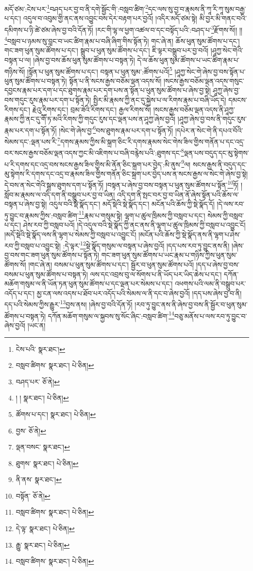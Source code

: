 མདོ་ཙམ་:ངེས་པར་\footnote{ངེས་པའི་  སྣར་ཐང་། }བཤད་པར་བྱ་བ་ནི་དགེ་སྦྱོང་གི་:བསླབ་ཚིག་\footnote{བསླབ་ཚིགས་  སྣར་ཐང་།  པེ་ཅིན། }དང་ལས་སུ་བྱ་བ་རྣམས་ནི་ཀཱ་རི་ཀཱ་སུམ་བརྒྱ་པ་དང་། འདུལ་བ་འབུམ་གྱི་ནང་ནས་འབྱུང་བས་དེར་བརྟག་པར་བྱའོ། །འདིར་མདོ་ཙམ་སྟེ། མི་བྱར་མི་གནང་བའི་དམིགས་པ་ཉི་ཚེ་ཙམ་ཞེས་བྱ་བའི་དོན་ཏོ། །རང་གི་ལྷ་ལ་ཕྱག་འཚལ་བ་དང་བསྟོད་པའི་:བཤད་པ་\footnote{བཤད་པར་  ཅོ་ནེ། }རྫོགས་སོ།། །།\footnote{། །  སྣར་ཐང་།  པེ་ཅིན། }བསླབ་པ་ཉམས་སུ་བླང་བ་ཡང་ཚིག་རྣམ་པ་བཞི་ཞིག་གིས་སྟོན་ཏེ། གང་ཞེ་ན། ཆོས་ཕུན་སུམ་ཚོགས་པ་དང་། གང་ཟག་ཕུན་སུམ་ཚོགས་པ་དང་། སྒྲུབ་པ་ཕུན་སུམ་ཚོགས་པ་དང་། ཇི་ལྟར་བསྒྲུབ་པར་བྱ་བའོ། །ཤཱཀྱ་སེང་གེའི་བསྟན་པ་ལ། །ཞེས་བྱ་བས་ཆོས་ཕུན་སུམ་ཚོགས་པ་བསྟན་ཏེ། དེ་ལ་ཆོས་ཕུན་སུམ་ཚོགས་པ་ཡང་ཚིག་རྣམ་པ་གཉིས་སོ། །སྟོན་པ་ཕུན་སུམ་ཚོགས་པ་དང་། བསྟན་པ་ཕུན་སུམ་:ཚོགས་པའོ།\footnote{ཚོགས་པ་དང་།  སྣར་ཐང་།  པེ་ཅིན། } །ཤཱཀྱ་སེང་གེ་ཞེས་བྱ་བས་སྟོན་པ་ཕུན་སུམ་ཚོགས་པ་བསྟན་ཏེ། སྟོན་པ་ནི་སངས་རྒྱས་བཅོམ་ལྡན་འདས་སོ། །སངས་རྒྱས་བཅོམ་ལྡན་འདས་གསུང་དབྱངས་རྣམ་པར་དག་པ་དང་ཐུགས་རྣམ་པར་དག་པས་ན་སྟོན་པ་ཕུན་སུམ་ཚོགས་པ་ཞེས་བྱ་སྟེ། ཤཱཀྱ་ཞེས་བྱ་བས་གདུང་རུས་རྣམ་པར་དག་པ་སྟོན་ཏེ། སྤྱིར་མི་རྣམས་ཀྱི་ནང་དུ་སྐྱེས་པ་ལ་རིགས་རྣམ་པ་བཞི་ཡོད་དེ། དམངས་རིགས་དང་། རྗེའུ་རིགས་དང་། བྲམ་ཟེའི་རིགས་དང་། རྒྱལ་རིགས་སོ། །སངས་རྒྱས་བཅོམ་ལྡན་འདས་ནི་ཤཱཀྱ་རྣམས་ཀྱི་ནང་དུ་གཽ་ཏ་མའི་རིགས་ཀྱི་གདུང་རུས་དང་ལྡན་པས་ན་ཤཱཀྱ་ཞེས་བྱའོ། །ཤཱཀྱ་ཞེས་བྱ་བས་ནི་གདུང་རུས་རྣམ་པར་དག་པ་སྟོན་ཏོ། །སེང་གེ་ཞེས་བྱ་\footnote{བྱས་  ཅོ་ནེ། }བས་ཐུགས་རྣམ་པར་དག་པ་སྟོན་ཏོ། །དཔེར་ན་སེང་གེ་ནི་དཔའ་བོའི་སེམས་དང་:ལྡན་པས་རི་\footnote{ལྡན་བསང་  སྣར་ཐང་། }དགས་རྣམས་ཀྱིས་མི་སྐྲག་ཅིང་རི་དགས་རྣམས་སེང་གེས་ཟིལ་གྱིས་གནོན་པ་དང་འདྲ་བར་སངས་རྒྱས་བཅོམ་ལྡན་འདས་ཀྱང་མི་འཇིགས་པ་བཞི་བརྙེས་པའི་:ཐུགས་དང་\footnote{ཐུགས་  སྣར་ཐང་།  པེ་ཅིན། }ལྡན་པས་བདུད་དང་མུ་སྟེགས་པ་རི་དགས་དང་འདྲ་བས་སངས་རྒྱས་ཟིལ་གྱིས་མི་ནོན་ཅིང་སྐྲག་པར་བྱེད་:མི་ནུས་\footnote{ནི་ནས་  སྣར་ཐང་། }ལ། སངས་རྒྱས་ནི་བདུད་དང་མུ་སྟེགས་རི་དགས་དང་འདྲ་བ་རྣམས་ཟིལ་གྱིས་གནོན་ཅིང་སྐྲག་པར་བྱེད་པས་ན་སངས་རྒྱས་ལ་སེང་གེ་ཞེས་བྱ་སྟེ། དེ་བས་ན་སེང་གེའི་སྒྲས་ཐུགས་དག་པ་སྟོན་ཏོ། །བསྟན་པ་ཞེས་བྱ་བས་བསྟན་པ་ཕུན་སུམ་ཚོགས་པ་སྟོན་\footnote{བསྟོན་  ཅོ་ནེ། }ཏོ། །སློབ་མ་རྣམས་ལ་འདི་དག་ནི་བསྒྲུབ་པར་བྱ་བ་ཡིན། འདི་དག་ནི་སྤང་བར་བྱ་བ་ཡིན་ནོ་ཞེས་སྟོན་པའི་ཆོས་ལ་བསྟན་པ་ཞེས་བྱ་སྟེ། འདུལ་བའི་སྡེ་སྣོད་དང་། མདོ་སྡེའི་སྡེ་སྣོད་དང་། མངོན་པའི་ཆོས་ཀྱི་སྡེ་སྣོད་དོ། །དེ་ལས་རབ་ཏུ་བྱུང་བ་རྣམས་ཀྱིས་:བསླབ་ཚིག་\footnote{བསླབ་ཚིགས་  སྣར་ཐང་།  པེ་ཅིན། }རྣམ་པ་གསུམ་སྟེ། ལྷག་པ་ཚུལ་ཁྲིམས་ཀྱི་བསླབ་པ་དང་། སེམས་ཀྱི་བསླབ་པ་དང་། ཤེས་རབ་ཀྱི་བསླབ་པའོ། །དེ་འདུལ་བའི་སྡེ་སྣོད་ཀྱི་ནང་ནས་ནི་ལྷག་པ་ཚུལ་ཁྲིམས་ཀྱི་བསླབ་པ་འབྱུང་ངོ། །མདོ་སྡེའི་སྡེ་སྣོད་ལས་ནི་ལྷག་པ་སེམས་ཀྱི་བསླབ་པ་འབྱུང་ངོ། །མངོན་པའི་ཆོས་ཀྱི་སྡེ་སྣོད་ནས་ནི་ལྷག་པ་ཤེས་རབ་ཀྱི་བསླབ་པ་འབྱུང་སྟེ། :དེ་ལྟར་\footnote{དེ་ལྟ་  སྣར་ཐང་།  པེ་ཅིན། }སྡེ་སྣོད་གསུམ་ལ་བསྟན་པ་ཞེས་བྱའོ། །དད་པས་རབ་ཏུ་བྱུང་ནས་ནི། །ཞེས་བྱ་བས་གང་ཟག་ཕུན་སུམ་ཚོགས་པ་སྟོན་ཏེ། གང་ཟག་ཕུན་སུམ་ཚོགས་པ་ཡང་རྣམ་པ་གཉིས་ཀྱིས་ཕུན་སུམ་ཚོགས་སོ། །གང་ཞེ་ན། བསམ་པ་ཕུན་སུམ་ཚོགས་པ་དང་། སྦྱོར་བ་ཕུན་སུམ་ཚོགས་པའོ། །དད་པ་ཞེས་བྱ་བས་བསམ་པ་ཕུན་སུམ་ཚོགས་པ་བསྟན་ཏེ། ལས་དང་འབྲས་བུ་ལ་སོགས་པ་ནི་ཡོད་པར་ཡིད་ཆེས་པ་དང་། དཀོན་མཆོག་གསུམ་ལ་ནི་ཡོན་ཏན་ཕུན་སུམ་ཚོགས་པ་དང་ལྡན་པར་སེམས་པ་དང་། འཕགས་པའི་ལམ་ནི་བསྒྲུབ་པར་འདོད་པ་དང་། མྱ་ངན་ལས་འདས་པ་ཐོབ་པར་འདོད་པའི་སེམས་ལ་ནི་དང་བ་ཞེས་བྱའོ། །དད་པས་ཞེས་བྱ་བ་ནི། དད་པའི་སེམས་ཀྱིས་རྒྱུར་\footnote{རྒྱུ་  སྣར་ཐང་།  པེ་ཅིན། }བྱས་ནས། །ཞེས་བྱ་བའི་དོན་ཏོ། །རབ་ཏུ་བྱུང་ནས་ནི་ཞེས་བྱ་བས་ནི་སྦྱོར་བ་ཕུན་སུམ་ཚོགས་པ་བསྟན་ཏེ། དཀོན་མཆོག་གསུམ་ལ་སྐྱབས་སུ་སོང་ཞིང་:བསླབ་ཚིག་\footnote{བསླབ་ཚིགས་  སྣར་ཐང་།  པེ་ཅིན། }བཅུ་མནོས་པ་ལས་རབ་ཏུ་བྱུང་བ་ཞེས་བྱའོ། །ཡང་ན། 